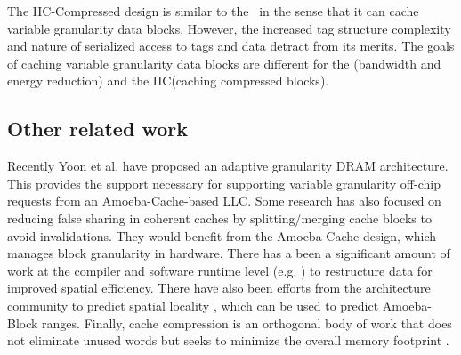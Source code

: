 The IIC-Compressed design is similar to the \AC\ in the sense that it can cache variable granularity data blocks. However, the increased tag structure complexity and nature of serialized access to tags and data detract from its merits. The goals of caching variable granularity data blocks are different for the \AC{}(bandwidth and energy reduction) and the IIC(caching compressed blocks). 

\subsection{Other related work}

Recently Yoon et al. have proposed an adaptive granularity DRAM architecture\cite{Yoon_Jeong_Erez_2011}. This provides the support necessary for supporting variable granularity off-chip requests from an Amoeba-Cache-based LLC. Some research \cite{Dubnicki:1992:ABS:139669.139725,Choi:2011:DRM:2120965.2121416} has also focused on reducing false sharing in coherent caches by splitting/merging cache blocks to avoid invalidations. They would benefit from the Amoeba-Cache design, which manages block granularity in hardware. There has a been a significant amount of work at the compiler and software runtime level (e.g. \cite{Chilimbi-Hill-pldi-1999}) to restructure data for improved spatial efficiency. There have also been efforts from the architecture community to predict spatial locality \cite{pujara-hpca-2006, Watkins:2008:RCB:1505816.1505849, kumar-isca-1998, yoon2012dgms}, which can be used to predict Amoeba-Block ranges. Finally, cache compression is an orthogonal body of work that does not eliminate unused words but seeks to minimize the overall memory footprint \cite{AlameldeenPHD}.

